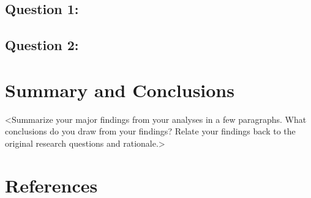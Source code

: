 \documentclass[12pt,]{article}
\begin{document}
\hypertarget{question-1}{%
\subsection{Question 1: }\label{question-1}}

\hypertarget{question-2}{%
\subsection{Question 2:}\label{question-2}}

\newpage

\hypertarget{summary-and-conclusions}{%
\section{Summary and Conclusions}\label{summary-and-conclusions}}

\textless{}Summarize your major findings from your analyses in a few
paragraphs. What conclusions do you draw from your findings? Relate your
findings back to the original research questions and
rationale.\textgreater{}

\newpage

\hypertarget{references}{%
\section{References}\label{references}}
\end{document}
